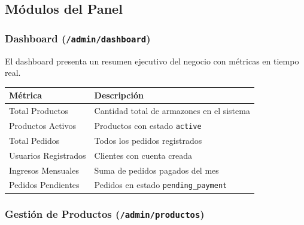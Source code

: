\documentclass[12pt, a4paper]{article}
\begin{document}
\subsection{M\'{o}dulos del Panel}

\subsubsection{Dashboard (\texttt{/admin/dashboard})}

El dashboard presenta un resumen ejecutivo del negocio con m\'{e}tricas en tiempo real.

\begin{table}[H]
\centering
\begin{tabularx}{\textwidth}{lX}
\toprule
\textbf{M\'{e}trica} & \textbf{Descripci\'{o}n} \\
\midrule
Total Productos & Cantidad total de armazones en el sistema \\
Productos Activos & Productos con estado \texttt{active} \\
Total Pedidos & Todos los pedidos registrados \\
Usuarios Registrados & Clientes con cuenta creada \\
Ingresos Mensuales & Suma de pedidos pagados del mes \\
Pedidos Pendientes & Pedidos en estado \texttt{pending\_payment} \\
\bottomrule
\end{tabularx}
\end{table}

\subsubsection{Gesti\'{o}n de Productos (\texttt{/admin/productos})}
\end{document}
